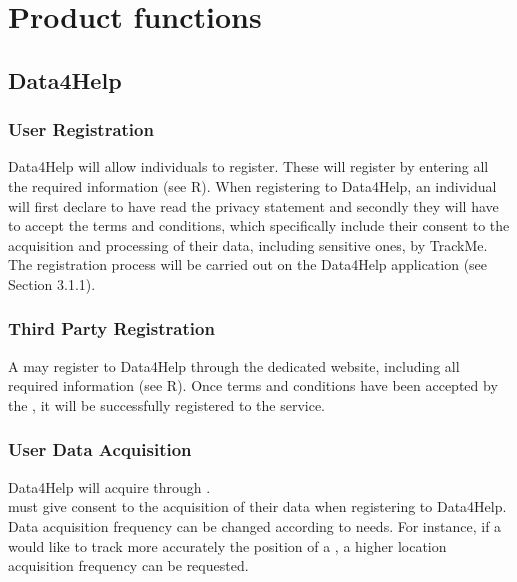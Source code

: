 \documentclass[../../rasd.tex]{subfiles}
\begin{document}
\section{Product functions}

	\subsection{Data4Help}
	
		\subsubsection{User Registration}
		Data4Help will allow individuals to register. These will register by entering all the required information (see R). When registering to Data4Help, an individual will first declare to have read the privacy statement and secondly they will have to accept the terms and conditions, which specifically include their consent to the acquisition and processing of their data, including sensitive ones, by TrackMe.\\
		The  registration process will be carried out on the Data4Help application (see Section 3.1.1).

		\subsubsection{Third Party Registration}
		A  may register to Data4Help through the  dedicated website, including all required information (see R).
		Once terms and conditions have been accepted by the , it will be successfully registered to the service.

		\subsubsection{User Data Acquisition}
		Data4Help will acquire  through . \\
		 must give consent to the acquisition of their data when registering to Data4Help.\\
		Data acquisition frequency can be changed according to  needs. For instance, if a  would like to track more accurately the position of a , a higher location acquisition frequency can be requested.
\end{document}

